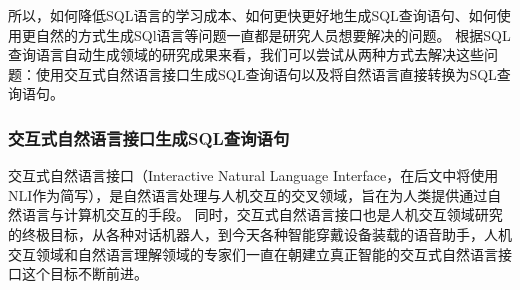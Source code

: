所以，如何降低SQL语言的学习成本、如何更快更好地生成SQL查询语句、如何使用更自然的方式生成SQl语言等问题一直都是研究人员想要解决的问题。
根据SQL查询语言自动生成领域的研究成果来看，我们可以尝试从两种方式去解决这些问题：使用交互式自然语言接口生成SQL查询语句以及将自然语言直接转换为SQL查询语句。





\subsubsection{交互式自然语言接口生成SQL查询语句}
\label{intro:nli2sql}
交互式自然语言接口（Interactive Natural Language Interface，在后文中将使用NLI作为简写），是自然语言处理与人机交互的交叉领域，旨在为人类提供通过自然语言与计算机交互的手段。
同时，交互式自然语言接口也是人机交互领域研究的终极目标，从各种对话机器人，到今天各种智能穿戴设备装载的语音助手，人机交互领域和自然语言理解领域的专家们一直在朝建立真正智能的交互式自然语言接口这个目标不断前进。


